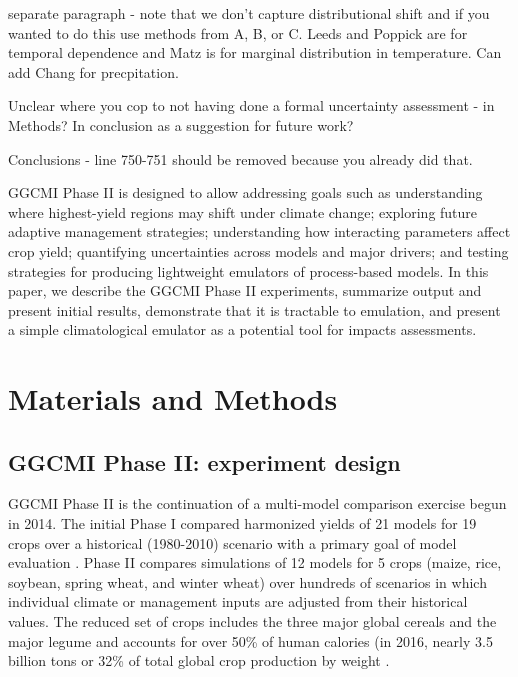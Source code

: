 \documentclass[preprint, 5p, times, twocolumn]{elsarticle}
\begin{document}
separate paragraph - note that we don't capture distributional shift and if you wanted to do this use methods from A, B, or C. Leeds and Poppick are for temporal dependence and Matz is for marginal distribution in temperature. Can add Chang for precpitation.

Unclear where you cop to not having done a formal uncertainty assessment - in Methods? In conclusion as a suggestion for future work?

Conclusions - line 750-751 should be removed because you already did that.







GGCMI Phase II is designed to allow addressing goals such as understanding where highest-yield regions may shift under climate change; exploring future adaptive management strategies; understanding how interacting parameters affect crop yield; quantifying uncertainties across models and major drivers; and testing strategies for producing lightweight emulators of process-based models. In this paper, we describe the GGCMI Phase II experiments, summarize output and present initial results, demonstrate that it is tractable to emulation, and present a simple climatological emulator as a potential tool for impacts assessments.

\section{Materials and Methods}
\label{S:2}
\subsection{GGCMI Phase II: experiment design}
GGCMI Phase II is the continuation of a multi-model comparison exercise begun in 2014. The initial Phase I compared harmonized yields of 21 models for 19 crops over a historical (1980-2010) scenario with a primary goal of model evaluation \citep{Elliott2015, muller_global_2017}. Phase II compares simulations of 12 models for 5 crops (maize, rice, soybean, spring wheat, and winter wheat) over hundreds of scenarios in which individual climate or management inputs are adjusted from their historical values. The reduced set of crops includes the three major global cereals and the major legume and accounts for over 50\% of human calories (in 2016, nearly 3.5 billion tons or 32\% of total global crop production by weight \citep{FAOSTAT}. 
\end{document}
